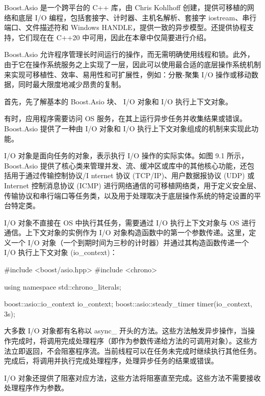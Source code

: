 
Boost.Asio 是一个跨平台的 C++ 库，由 Chris Kohlhoff 创建，提供可移植的网络和底层 I/O 编程，包括套接字、计时器、主机名解析、套接字 iostream、串行端口、文件描述符和 Windows HANDLE，提供一致的异步模型。还提供协程支持，它们现在在 C++20 中可用，因此在本章中仅简要进行介绍。

Boost.Asio 允许程序管理长时间运行的操作，而无需明确使用线程和锁。此外，由于它在操作系统服务之上实现了一层，因此可以使用最合适的底层操作系统机制来实现可移植性、效率、易用性和可扩展性，例如：分散-聚集 I/O 操作或移动数据，同时最大限度地减少昂贵的复制。

首先，先了解基本的 Boost.Asio 块、 I/O 对象和 I/O 执行上下文对象。


有时，应用程序需要访问 OS 服务，在其上运行异步任务并收集结果或错误。 Boost.Asio 提供了一种由 I/O 对象和 I/O 执行上下文对象组成的机制来实现此功能。

I/O 对象是面向任务的对象，表示执行 I/O 操作的实际实体。如图 9.1 所示， Boost.Asio 提供了核心类来管理并发、流、缓冲区或库中的其他核心功能，还包括用于通过传输控制协议/I nternet 协议 (TCP/IP)、用户数据报协议 (UDP) 或 Internet 控制消息协议 (ICMP) 进行网络通信的可移植网络类，用于定义安全层、传输协议和串行端口等任务类，以及用于处理取决于底层操作系统的特定设置的平台特定类。


I/O 对象不直接在 OS 中执行其任务，需要通过 I/O 执行上下文对象与 OS 进行通信。上下文对象的实例作为 I/O 对象构造函数中的第一个参数传递。这里，定义一个 I/O 对象（一个到期时间为三秒的计时器）并通过其构造函数传递一个 I/O 执行上下文对象 (io\_context)：

\begin{cpp}
#include <boost/asio.hpp>
#include <chrono>

using namespace std::chrono_literals;

boost::asio::io_context io_context;
boost::asio::steady_timer timer(io_context, 3s);
\end{cpp}

大多数 I/O 对象都有名称以 async\_ 开头的方法。这些方法触发异步操作，当操作完成时，将调用完成处理程序（即作为参数传递给方法的可调用对象）。这些方法立即返回，不会阻塞程序流。当前线程可以在任务未完成时继续执行其他任务。完成后，将调用并执行完成处理程序，处理异步任务的结果或错误。

I/O 对象还提供了阻塞对应方法，这些方法将阻塞直至完成。这些方法不需要接收处理程序作为参数。


